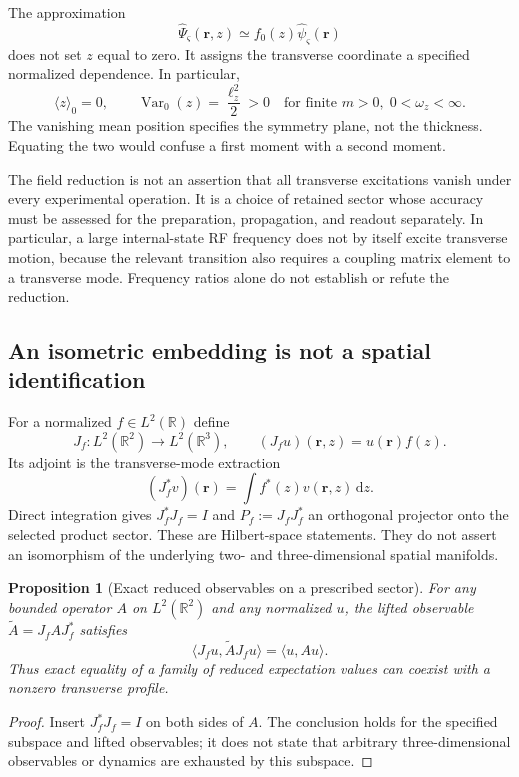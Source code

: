 \documentclass[11pt,a4paper]{article}
\newtheorem{proposition}{Proposition}[section]
\theoremstyle{definition}
\theoremstyle{remark}
\newcommand{\dd}{\mathrm{d}}
\newcommand{\Var}{\operatorname{Var}}
\newcommand{\R}{\mathbb{R}}
\newcommand{\lop}{\ell_z}
\begin{document}
The approximation
\begin{equation}
 \widehat\Psi_{\varsigma}(\boldsymbol r,z)
 \simeq f_0(z)\widehat\psi_{\varsigma}(\boldsymbol r)
 \label{eq:factorization}
\end{equation}
does not set $z$ equal to zero. It assigns the transverse coordinate a specified normalized dependence. In particular,
\begin{equation}
 \langle z\rangle_0=0,\qquad
 \Var_0(z)=\frac{\lop^2}{2}>0
 \quad\text{for finite }m>0,\;0<\omega_z<\infty.
 \label{eq:width}
\end{equation}
The vanishing mean position specifies the symmetry plane, not the thickness. Equating the two would confuse a first moment with a second moment.

The field reduction is not an assertion that all transverse excitations vanish under every experimental operation. It is a choice of retained sector whose accuracy must be assessed for the preparation, propagation, and readout separately. In particular, a large internal-state RF frequency does not by itself excite transverse motion, because the relevant transition also requires a coupling matrix element to a transverse mode. Frequency ratios alone do not establish or refute the reduction.\cite{zhang2026,precursor}

\subsection{An isometric embedding is not a spatial identification}
For a normalized $f\in L^2(\R)$ define
\begin{equation}
 J_f:L^2(\R^2)\longrightarrow L^2(\R^3),
 \qquad (J_f u)(\boldsymbol r,z)=u(\boldsymbol r)f(z).
 \label{eq:isometry}
\end{equation}
Its adjoint is the transverse-mode extraction
\begin{equation}
 (J_f^*v)(\boldsymbol r)=\int f^*(z)v(\boldsymbol r,z)\,\dd z.
 \label{eq:adjoint}
\end{equation}
Direct integration gives $J_f^*J_f=I$ and $P_f:=J_fJ_f^*$ an orthogonal projector onto the selected product sector. These are Hilbert-space statements. They do not assert an isomorphism of the underlying two- and three-dimensional spatial manifolds.

\begin{proposition}[Exact reduced observables on a prescribed sector]
For any bounded operator $A$ on $L^2(\R^2)$ and any normalized $u$, the lifted observable $\widetilde A=J_fAJ_f^*$ satisfies
\begin{equation}
 \langle J_fu,\widetilde A J_fu\rangle
 =\langle u,Au\rangle.
 \label{eq:expectation_lift}
\end{equation}
Thus exact equality of a family of reduced expectation values can coexist with a nonzero transverse profile.
\end{proposition}
\begin{proof}
Insert $J_f^*J_f=I$ on both sides of $A$. The conclusion holds for the specified subspace and lifted observables; it does not state that arbitrary three-dimensional observables or dynamics are exhausted by this subspace.
\end{proof}
\end{document}
